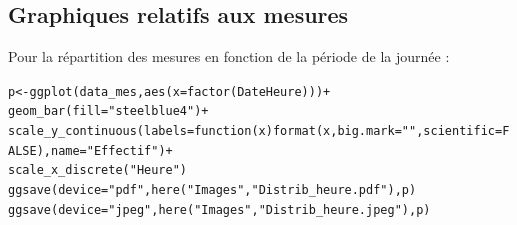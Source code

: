 \documentclass[11pt]{article}\usepackage[]{graphicx}\usepackage[]{color}
\makeatletter
\newcommand{\hlnum}[1]{\textcolor[rgb]{0.063,0.58,0.627}{#1}}%
\newcommand{\hlstr}[1]{\textcolor[rgb]{0.063,0.58,0.627}{#1}}%
\newcommand{\hlopt}[1]{\textcolor[rgb]{0.196,0.196,0.196}{#1}}%
\newcommand{\hlstd}[1]{\textcolor[rgb]{0.196,0.196,0.196}{#1}}%
\newcommand{\hlkwa}[1]{\textcolor[rgb]{0.231,0.416,0.784}{#1}}%
\newcommand{\hlkwb}[1]{\textcolor[rgb]{0.627,0,0.314}{#1}}%
\newcommand{\hlkwc}[1]{\textcolor[rgb]{0,0.631,0.314}{#1}}%
\newcommand{\hlkwd}[1]{\textcolor[rgb]{0.78,0.227,0.412}{#1}}%
\newenvironment{kframe}{%
 \def\at@end@of@kframe{}%
 \ifinner\ifhmode%
  \def\at@end@of@kframe{\end{minipage}}%
  \begin{minipage}{\columnwidth}%
 \fi\fi%
 \def\FrameCommand##1{\hskip\@totalleftmargin \hskip-\fboxsep
 \colorbox{shadecolor}{##1}\hskip-\fboxsep
     \hskip-\linewidth \hskip-\@totalleftmargin \hskip\columnwidth}%
 \MakeFramed {\advance\hsize-\width
   \@totalleftmargin\z@ \linewidth\hsize
   \@setminipage}}%
 {\par\unskip\endMakeFramed%
 \at@end@of@kframe}
\newenvironment{knitrout}{}{} %
\makeatother
\begin{document}
\begin{center}
\end{center}


\subsection{Graphiques relatifs aux mesures}

Pour la répartition des mesures en fonction de la période de la journée :
\begin{knitrout}\footnotesize
{}\color{fgcolor}\begin{kframe}
\begin{alltt}
\hlstd{p} \hlkwb{<-} \hlkwd{ggplot}\hlstd{(data_mes,} \hlkwd{aes}\hlstd{(}\hlkwc{x} \hlstd{=} \hlkwd{factor}\hlstd{(DateHeure)))} \hlopt{+}
  \hlkwd{geom_bar}\hlstd{(}\hlkwc{fill}\hlstd{=}\hlstr{"steelblue4"}\hlstd{)} \hlopt{+}
  \hlkwd{scale_y_continuous}\hlstd{(}\hlkwc{labels}\hlstd{=}\hlkwa{function}\hlstd{(}\hlkwc{x}\hlstd{)} \hlkwd{format}\hlstd{(x,} \hlkwc{big.mark} \hlstd{=} \hlstr{" "}\hlstd{,} \hlkwc{scientific} \hlstd{=} \hlnum{FALSE}\hlstd{),} \hlkwc{name}\hlstd{=}\hlstr{"Effectif"}\hlstd{)} \hlopt{+}
  \hlkwd{scale_x_discrete}\hlstd{(}\hlstr{"Heure"}\hlstd{)}
\hlkwd{ggsave}\hlstd{(}\hlkwc{device}\hlstd{=}\hlstr{"pdf"}\hlstd{,} \hlkwd{here}\hlstd{(}\hlstr{"Images"}\hlstd{,}\hlstr{"Distrib_heure.pdf"}\hlstd{),p)}
\hlkwd{ggsave}\hlstd{(}\hlkwc{device}\hlstd{=}\hlstr{"jpeg"}\hlstd{,} \hlkwd{here}\hlstd{(}\hlstr{"Images"}\hlstd{,}\hlstr{"Distrib_heure.jpeg"}\hlstd{),p)}
\end{alltt}
\end{kframe}
\end{knitrout}
\end{document}

